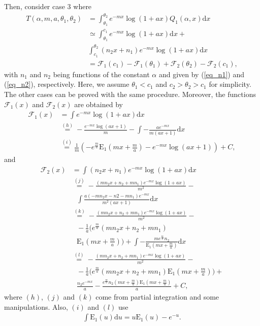 Then, consider case 3 where
\begin{align}
    T(\alpha,m,a,\theta_1,\theta_2) &= \int_{\theta_1}^{\theta_2} e^{-mx}\log(1+ax)Q_1(\alpha,x)\text{d}x\nonumber\\
    &\simeq \int_{\theta_1}^{c_1} e^{-mx}\log(1+ax)\text{d}x + \nonumber\\
   & \int_{c_1}^{\theta_2} (n_2x+n_1)e^{-mx}\log(1+ax) \text{d}x\nonumber\\
   & =  \mathcal{F}_1(c_1) -  \mathcal{F}_1(\theta_1) +  \mathcal{F}_2(\theta_2) -  \mathcal{F}_2(c_1),
\end{align}
with $n_1$ and $n_2$ being functions of the constant $\alpha$ and given by (\ref{eq_n1}) and (\ref{eq_n2}), respectively. Here, we assume $\theta_1<c_1$ and $c_2> \theta_2 > c_1$ for simplicity. The other cases can be proved with the same procedure. Moreover, the functions $\mathcal{F}_1(x)$ and $\mathcal{F}_2(x)$ are obtained by
\begin{align}
    \mathcal{F}_1(x) &= \int e^{-mx}\log(1+ax)\text{d}x\nonumber\\
    &\overset{(h)}= -\frac{e^{-mx}\log(ax+1)}{m}-\int -\frac{ae^{-mx}}{m(ax+1)} \text{d}x\nonumber\\
    & \overset{(i)}=  \frac{1}{m}\left(-e^{\frac{m}{a}}\operatorname{E_1}\left(mx+\frac{m}{a}\right)-e^{-mx}\log(ax+1)\right)+C,
\end{align}
and
\begin{align}
     \mathcal{F}_2(x)& =  \int (n_2x+n_1)e^{-mx}\log(1+ax) \text{d}x\nonumber\\
    &\overset{(j)} = -\frac{(mn_2x+n_2+mn_1)e^{-mx}\log(1+ax)}{m^2} - \nonumber\\
    &~~~\int \frac{a(-mn_2x-n2-mn_1)e^{-mx}}{m^2(ax+1)} \text{d}x\nonumber\\
    & \overset{(k)}= -\frac{(mn_2x+n_2+mn_1)e^{-mx}\log(1+ax)}{m^2} - \nonumber\\
    &~~~ -\frac{1}{a}\bigg(e^{\frac{m}{a}}(mn_2x+n_2+mn_1)\nonumber\\
    &~~~ \operatorname{E_1}\left(mx+\frac{m}{a}\right)\bigg)+
    \int - \frac{me^{\frac{m}{a}}n_2}{\operatorname{E_1}\left(mx+\frac{m}{a}\right)} \text{d}x\nonumber\\
    & \overset{(l)}= -\frac{(mn_2x+n_2+mn_1)e^{-mx}\log(1+ax)}{m^2} - \nonumber\\
    &~~~ -\frac{1}{a}\bigg(e^{\frac{m}{a}}(mn_2x+n_2+mn_1) \operatorname{E_1}\left(mx+\frac{m}{a}\right)\bigg)+\nonumber\\
    &~~~  \frac{n_2e^{-mx}}{a} - \frac{e^{\frac{m}{a}}n_2(mx+\frac{m}{a}) \operatorname{E_1}\left(mx+\frac{m}{a}\right)}{a}+C,
\end{align}
where $(h)$, $(j)$ and $(k)$ come from partial integration and some manipulations. Also, $(i)$ and $(l)$ use \cite[p. 195]{geller1969table}
\begin{align}
    \int \operatorname{E_1}(u) \text{d}u = u\operatorname{E_1}(u)-e^{-u}.
\end{align}








